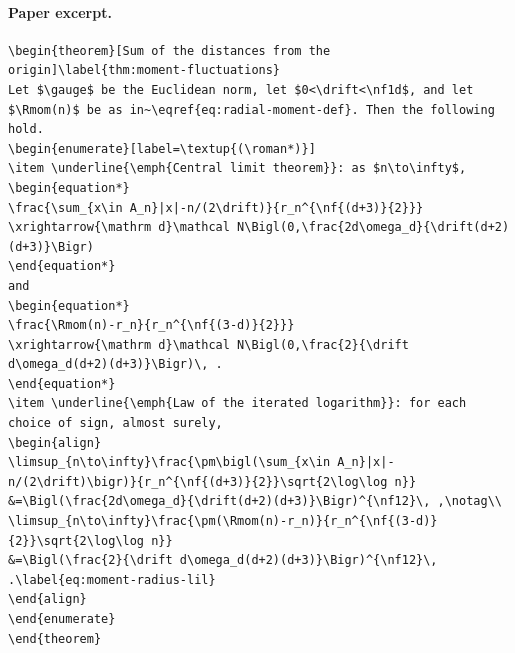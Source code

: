 \paragraph{Paper excerpt.}
\begin{verbatim}
\begin{theorem}[Sum of the distances from the origin]\label{thm:moment-fluctuations}
Let $\gauge$ be the Euclidean norm, let $0<\drift<\nf1d$, and let $\Rmom(n)$ be as in~\eqref{eq:radial-moment-def}. Then the following hold.
\begin{enumerate}[label=\textup{(\roman*)}]
\item \underline{\emph{Central limit theorem}}: as $n\to\infty$,
\begin{equation*}
\frac{\sum_{x\in A_n}|x|-n/(2\drift)}{r_n^{\nf{(d+3)}{2}}}
\xrightarrow{\mathrm d}\mathcal N\Bigl(0,\frac{2d\omega_d}{\drift(d+2)(d+3)}\Bigr)
\end{equation*}
and
\begin{equation*}
\frac{\Rmom(n)-r_n}{r_n^{\nf{(3-d)}{2}}}
\xrightarrow{\mathrm d}\mathcal N\Bigl(0,\frac{2}{\drift d\omega_d(d+2)(d+3)}\Bigr)\, .
\end{equation*}
\item \underline{\emph{Law of the iterated logarithm}}: for each choice of sign, almost surely,
\begin{align}
\limsup_{n\to\infty}\frac{\pm\bigl(\sum_{x\in A_n}|x|-n/(2\drift)\bigr)}{r_n^{\nf{(d+3)}{2}}\sqrt{2\log\log n}}
&=\Bigl(\frac{2d\omega_d}{\drift(d+2)(d+3)}\Bigr)^{\nf12}\, ,\notag\\
\limsup_{n\to\infty}\frac{\pm(\Rmom(n)-r_n)}{r_n^{\nf{(3-d)}{2}}\sqrt{2\log\log n}}
&=\Bigl(\frac{2}{\drift d\omega_d(d+2)(d+3)}\Bigr)^{\nf12}\, .\label{eq:moment-radius-lil}
\end{align}
\end{enumerate}
\end{theorem}
\end{verbatim}

